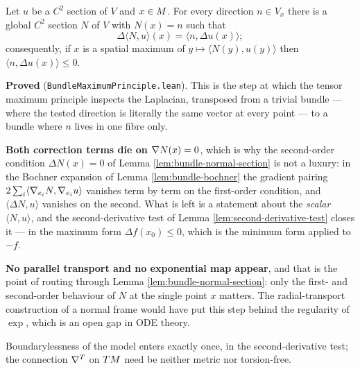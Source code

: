 \begin{lemma}
  \label{lem:bundle-touching-point}
  \leanok
  Let $u$ be a $C^2$ section of $V$ and $x \in M$. For every direction $n \in V_x$ there is
  a global $C^2$ section $N$ of $V$ with $N(x) = n$ such that
  \[
    \Delta\langle N, u\rangle(x) = \langle n, \Delta u(x)\rangle ;
  \]
  consequently, if $x$ is a spatial maximum of $y \mapsto \langle N(y), u(y)\rangle$ then
  $\langle n, \Delta u(x)\rangle \le 0$.

  \textbf{Proved} (\texttt{BundleMaximumPrinciple.lean}). This is the step at which the
  tensor maximum principle inspects the Laplacian, transposed from a trivial bundle --- where
  the tested direction is literally the same vector at every point --- to a bundle where
  $n$ lives in one fibre only.

  \textbf{Both correction terms die on $\nabla N(x) = 0$}, which is why the second-order
  condition $\Delta N(x) = 0$ of Lemma \ref{lem:bundle-normal-section} is not a luxury: in
  the Bochner expansion of Lemma \ref{lem:bundle-bochner} the gradient pairing
  $2\sum_i\langle\nabla_{e_i}N,\nabla_{e_i}u\rangle$ vanishes term by term on the first-order
  condition, and $\langle\Delta N, u\rangle$ vanishes on the second. What is left is a
  statement about the \emph{scalar} $\langle N, u\rangle$, and the second-derivative test of
  Lemma \ref{lem:second-derivative-test} closes it --- in the maximum form
  $\Delta f(x_0) \le 0$, which is the minimum form applied to $-f$.

  \textbf{No parallel transport and no exponential map appear}, and that is the point of
  routing through Lemma \ref{lem:bundle-normal-section}: only the first- and second-order
  behaviour of $N$ at the single point $x$ matters. The radial-transport construction of a
  normal frame would have put this step behind the regularity of $\exp$, which is an open
  gap in ODE theory.

  Boundarylessness of the model enters exactly once, in the second-derivative test; the
  connection $\nabla^T$ on $TM$ need be neither metric nor torsion-free.
\end{lemma}

